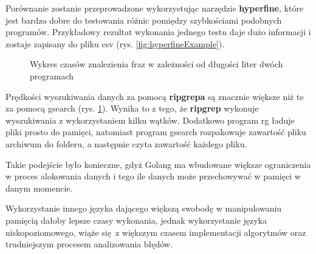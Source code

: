Porównanie zostanie przeprowadzone wykorzystując narzędzie \textbf{hyperfine}, które
jest bardzo dobre do testowania różnic pomiędzy szybkościami podobnych programów.
Przykładowy rezultat wykonania jednego testu daje dużo informacji i zostaje
zapisany do pliku csv (rys. \ref{fig:hyperfineExample}).

\begin{figure}[h]
    \centering
    \caption{Wykres czasów znalezienia fraz w zależności od długości liter dwóch programach}
    \label{fig:wykresPorównaniaCzasówWyszukań}
\end{figure}

Prędkości wyszukiwania danych za pomocą \textbf{ripgrepa} są znacznie większe niż te
za pomocą gsearch (rys. \ref{fig:wykresPorównaniaCzasówWyszukań}). Wynika to z
tego, że \textbf{ripgrep} wykonuje wyszukiwania z wykorzystaniem kilku wątków. Dodatkowo 
program rg ładuje pliki prosto do pamięci, natomiast program gsearch rozpakowuje
zawartość pliku archiwum do folderu, a następnie czyta zawartość każdego pliku.

Takie podejście było konieczne, gdyż Golang ma wbudowane większe ograniczenia w 
proces alokowania danych i tego ile danych może przechowywać w pamięci w danym momencie.

Wykorzystanie innego języka dającego większą swobodę w manipulowaniu pamięcią 
dałoby lepsze czasy wykonania, jednak wykorzystanie języka niskopoziomowego,
wiąże się z większym czasem implementacji algorytmów oraz trudniejszym procesem
analizowania błędów.

